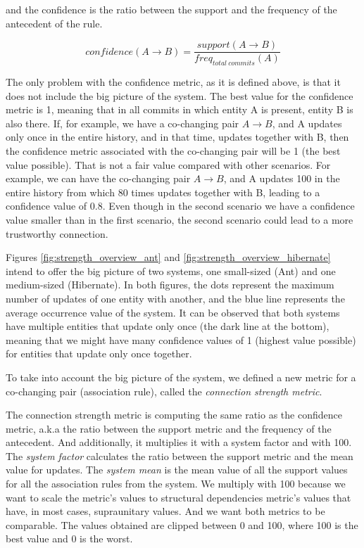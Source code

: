 \documentclass[runningheads]{comsis2}
\begin{document}
and the confidence is the ratio between the support and the frequency of the antecedent of the rule.

\begin{equation}
confidence (A \rightarrow B) =\frac{support (A \rightarrow B) }{freq_{total\ commits}(A)}
\end{equation}


The only problem with the confidence metric, as it is defined above, is that it does not include the big picture of the system.
The best value for the confidence metric is 1, meaning that in all commits in which entity A is present, entity B is also there. If, for example, we have a co-changing pair $A \rightarrow B$, and A updates only once in the entire history, and in that time, updates together with B, then the confidence metric associated with the co-changing pair will be 1 (the best value possible). That is not a fair value compared with other scenarios. For example, we can have the co-changing pair $A \rightarrow B$, and A updates 100 in the entire history from which 80 times updates together with B, leading to a confidence value of 0.8.
Even though in the second scenario we have a confidence value smaller than in the first scenario, the second scenario could lead to a more trustworthy connection.


Figures \ref{fig:strength_overview_ant} and \ref{fig:strength_overview_hibernate}  intend to offer the big picture of two systems, one small-sized (Ant) and one medium-sized (Hibernate). In both figures, the dots represent the maximum number of updates of one entity with another, and the blue line represents the average occurrence value of the system.
It can be observed that both systems have multiple entities that update only once (the dark line at the bottom), meaning that we might have many confidence values of 1 (highest value possible) for entities that update only once together.


To take into account the big picture of the system, we defined a new metric for a co-changing pair (association rule), called the \textit{connection strength metric}. 

The connection strength metric is computing the same ratio as the confidence metric, a.k.a the ratio between the support metric and the frequency of the antecedent. And additionally, it multiplies it with a system factor and with 100. 
The \textit{system factor} calculates the ratio between the support metric and the mean value for updates. The \textit{system mean} is the mean value of all the support values for all the association rules from the system. 
We multiply with 100 because we want to scale the metric's values to structural dependencies metric's values that have, in most cases, supraunitary values. And we want both metrics to be comparable. The values obtained are clipped between 0 and 100, where 100 is the best value and 0 is the worst.
\end{document}
